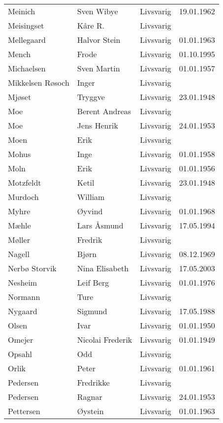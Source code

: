 \begin{longtable}{llll}
        Meinich	&	Sven Wibye	&	Livsvarig 	&	19.01.1962	\\
        Meisingset	&	Kåre R.	&	Livsvarig 	&		\\
        Mellegaard	&	Halvor Stein	&	Livsvarig 	&	01.01.1963	\\
        Mench 	&	Frode	&	Livsvarig	&	01.10.1995	\\
        Michaelsen	&	Sven Martin	&	Livsvarig 	&	01.01.1957	\\
        Mikkelsen Røsoch	&	Inger	&	Livsvarig 	&		\\
        Mjøset	&	Tryggve	&	Livsvarig 	&	23.01.1948	\\
        Moe	&	Berent Andreas	&	Livsvarig 	&		\\
        Moe	&	Jens Henrik	&	Livsvarig 	&	24.01.1953	\\
        Moen	&	Erik	&	Livsvarig 	&		\\
        Mohus	&	Inge	&	Livsvarig 	&	01.01.1958	\\
        Moln	&	Erik	&	Livsvarig 	&	01.01.1956	\\
        Motzfeldt	&	Ketil	&	Livsvarig 	&	23.01.1948	\\
        Murdoch	&	William	&	Livsvarig 	&		\\
        Myhre	&	Øyvind	&	Livsvarig 	&	01.01.1968	\\
        Mæhle	&	Lars Åsmund	&	Livsvarig 	&	17.05.1994	\\
        Møller	&	Fredrik	&	Livsvarig 	&		\\
        Nagell	&	Bjørn	&	Livsvarig 	&	08.12.1969	\\
        Nerbø Storvik 	&	Nina Elisabeth	&	Livsvarig	&	17.05.2003	\\
        Nesheim	&	Leif Berg	&	Livsvarig 	&	01.01.1976	\\
        Normann	&	Ture	&	Livsvarig 	&		\\
        Nygaard	&	Sigmund	&	Livsvarig 	&	17.05.1988	\\
        Olsen	&	Ivar	&	Livsvarig 	&	01.01.1950	\\
        Omejer	&	Nicolai Frederik	&	Livsvarig 	&	01.01.1949	\\
        Opsahl	&	Odd	&	Livsvarig 	&		\\
        Orlik	&	Peter	&	Livsvarig 	&	01.01.1961	\\
        Pedersen	&	Fredrikke	&	Livsvarig 	&		\\
        Pedersen	&	Ragnar	&	Livsvarig 	&	24.01.1953	\\
        Pettersen	&	Øystein	&	Livsvarig 	&	01.01.1963	\\

\end{longtable}
